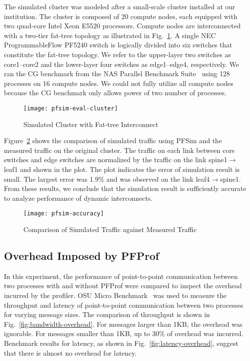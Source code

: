 The simulated cluster was modeled after a small-scale cluster installed at our
institution. The cluster is composed of 20 compute nodes, each equipped with
two quad-core Intel Xeon E5520 processors. Compute nodes are interconnected
with a two-tier fat-tree topology as illustrated in
Fig.~\ref{fig:cluster-config}. A single NEC ProgrammableFlow PF5240 switch is
logically divided into six switches that constitute the fat-tree topology.
We refer to the upper-layer two switches as core1--core2 and the lower-layer
four switches as edge1--edge4, respectively. We ran the CG benchmark from the
NAS Parallel Benchmark Suite~\autocite{Bailey1991} using 128 processes on 16
compute nodes. We could not fully utilize all compute nodes because the CG
benchmark only allows power of two number of processes.

\begin{figure}
    \centering
    \texttt{[image: pfsim-eval-cluster]}
    \caption{Simulated Cluster with Fat-tree Interconnect}%
    \label{fig:cluster-config}
\end{figure}

Figure~\ref{fig:pfsim-accuracy} shows the comparison of simulated traffic
using PFSim and the measured traffic on the original cluster. The traffic on
each link between core switches and edge switches are normalized by the
traffic on the link spine1$\rightarrow$leaf1 and shown in the plot. The plot
indicates the error of simulation result is small. The largest error was 1.9\%
and was observed on the link leaf4$\rightarrow$spine1. From these results, we
conclude that the simulation result is sufficiently accurate to analyze
performance of dynamic interconnects.

\begin{figure}
    \centering
    \texttt{[image: pfsim-accuracy]}
    \caption{Comparison of Simulated Traffic against Measured Traffic}%
    \label{fig:pfsim-accuracy}
\end{figure}

\subsection{Overhead Imposed by PFProf}

In this experiment, the performance of point-to-point communication
between two processes with and without PFProf were compared to inspect
the overhead incurred by the profiler. OSU Micro
Benchmark~\autocite{omb} was used to measure the throughput and latency
of point-to-point communication between two processes for varying
message sizes. The comparison of throughput is shown in
Fig.~\ref{fig:bandwidth-overhead}. For messages larger than 1KB, the
overhead was ignorable. For messages smaller than 1KB, up to 30\% of
overhead was incurred. Benchmark results for latency, as shown in
Fig.~\ref{fig:latency-overhead}, suggest that there is almost no
overhead for latency.

